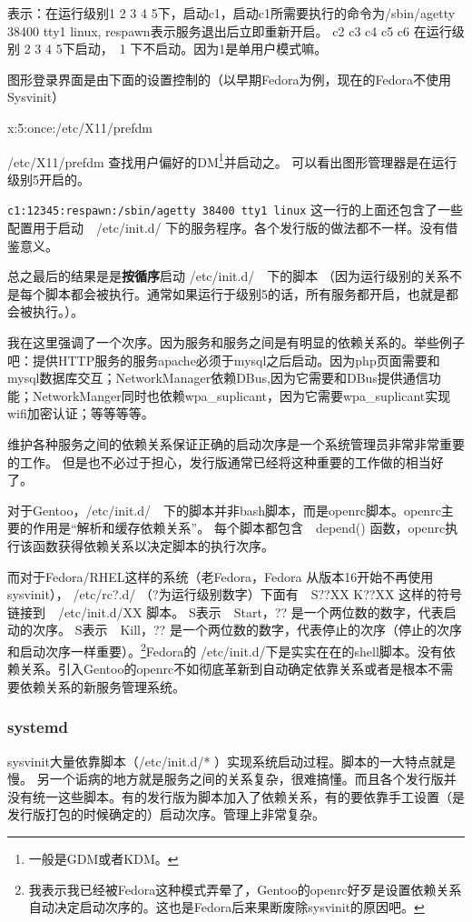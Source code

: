 表示：在运行级别1 2 3 4 5下，启动c1，启动c1所需要执行的命令为/sbin/agetty 38400 tty1 linux, respawn表示服务退出后立即重新开启。
c2 c3 c4 c5 c6 在运行级别 2 3 4 5下启动，　1 下不启动。因为1是单用户模式嘛。

图形登录界面是由下面的设置控制的（以早期Fedora为例，现在的Fedora不使用Sysvinit）
\begin{code}
x:5:once:/etc/X11/prefdm 
\end{code}
/etc/X11/prefdm 查找用户偏好的DM\footnote{一般是GDM或者KDM。}并启动之。
可以看出图形管理器是在运行级别5开启的。


{\tt c1:12345:respawn:/sbin/agetty 38400 tty1 linux} 这一行的上面还包含了一些配置用于启动　/etc/init.d/ 下的服务程序。各个发行版的做法都不一样。没有借鉴意义。

总之最后的结果是是\textbf{按循序}启动 /etc/init.d/　下的脚本
（因为运行级别的关系不是每个脚本都会被执行。通常如果运行于级别5的话，所有服务都开启，也就是都会被执行。）。

我在这里强调了一个次序。因为服务和服务之间是有明显的依赖关系的。举些例子吧：提供HTTP服务的服务apache必须于mysql之后启动。因为php页面需要和mysql数据库交互；NetworkManager依赖DBus,因为它需要和DBus提供通信功能；NetworkManger同时也依赖wpa\_suplicant，因为它需要wpa\_suplicant实现wifi加密认证；等等等等。

维护各种服务之间的依赖关系保证正确的启动次序是一个系统管理员非常非常重要的工作。
但是也不必过于担心，发行版通常已经将这种重要的工作做的相当好了。

对于Gentoo，/etc/init.d/　下的脚本并非bash脚本，而是openrc脚本。openrc主要的作用是“解析和缓存依赖关系”。
每个脚本都包含　depend() 函数，openrc执行该函数获得依赖关系以决定脚本的执行次序。

而对于Fedora/RHEL这样的系统（老Fedora，Fedora 从版本16开始不再使用sysvinit）， /etc/rc?.d/ （?为运行级别数字）下面有　S??XX K??XX 这样的符号链接到　/etc/init.d/XX 脚本。 %
S表示　Start，?? 是一个两位数的数字，代表启动的次序。
S表示　Kill，?? 是一个两位数的数字，代表停止的次序（停止的次序和启动次序一样重要）。\footnote{
我表示我已经被Fedora这种模式弄晕了，Gentoo的openrc好歹是设置依赖关系自动决定启动次序的。这也是Fedora后来果断废除sysvinit的原因吧。}Fedora的 /etc/init.d/下是实实在在的shell脚本。没有依赖关系。引入Gentoo的openrc不如彻底革新到自动确定依靠关系或者是根本不需要依赖关系的新服务管理系统。

\subsubsection{systemd}
sysvinit大量依靠脚本（/etc/init.d/* ）实现系统启动过程。脚本的一大特点就是慢。
另一个诟病的地方就是服务之间的关系复杂，很难搞懂。而且各个发行版并没有统一这些脚本。有的发行版为脚本加入了依赖关系，有的要依靠手工设置（是发行版打包的时候确定的）启动次序。管理上非常复杂。

